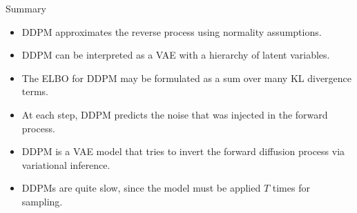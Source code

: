 \documentclass{beamer}
\begin{document}
\begin{frame}{Summary}
    \begin{itemize}
        \item DDPM approximates the reverse process using normality assumptions.     
        \vfill
        \item DDPM can be interpreted as a VAE with a hierarchy of latent variables.
        \vfill
        \item The ELBO for DDPM may be formulated as a sum over many KL divergence terms.
        \vfill
        \item At each step, DDPM predicts the noise that was injected in the forward process. 
        \vfill
        \item DDPM is a VAE model that tries to invert the forward diffusion process via variational inference. 
        \vfill
        \item DDPMs are quite slow, since the model must be applied $T$ times for sampling.
    \end{itemize}
\end{frame}

\end{document}
